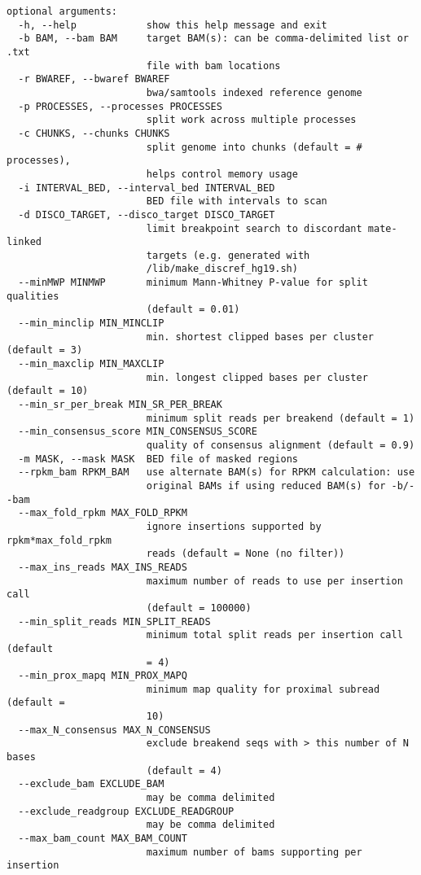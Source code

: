 \documentclass[letterpaper,11pt]{article}
\begin{document}
\begin{verbatim}
optional arguments:
  -h, --help            show this help message and exit
  -b BAM, --bam BAM     target BAM(s): can be comma-delimited list or .txt
                        file with bam locations
  -r BWAREF, --bwaref BWAREF
                        bwa/samtools indexed reference genome
  -p PROCESSES, --processes PROCESSES
                        split work across multiple processes
  -c CHUNKS, --chunks CHUNKS
                        split genome into chunks (default = # processes),
                        helps control memory usage
  -i INTERVAL_BED, --interval_bed INTERVAL_BED
                        BED file with intervals to scan
  -d DISCO_TARGET, --disco_target DISCO_TARGET
                        limit breakpoint search to discordant mate-linked
                        targets (e.g. generated with
                        /lib/make_discref_hg19.sh)
  --minMWP MINMWP       minimum Mann-Whitney P-value for split qualities
                        (default = 0.01)
  --min_minclip MIN_MINCLIP
                        min. shortest clipped bases per cluster (default = 3)
  --min_maxclip MIN_MAXCLIP
                        min. longest clipped bases per cluster (default = 10)
  --min_sr_per_break MIN_SR_PER_BREAK
                        minimum split reads per breakend (default = 1)
  --min_consensus_score MIN_CONSENSUS_SCORE
                        quality of consensus alignment (default = 0.9)
  -m MASK, --mask MASK  BED file of masked regions
  --rpkm_bam RPKM_BAM   use alternate BAM(s) for RPKM calculation: use
                        original BAMs if using reduced BAM(s) for -b/--bam
  --max_fold_rpkm MAX_FOLD_RPKM
                        ignore insertions supported by rpkm*max_fold_rpkm
                        reads (default = None (no filter))
  --max_ins_reads MAX_INS_READS
                        maximum number of reads to use per insertion call
                        (default = 100000)
  --min_split_reads MIN_SPLIT_READS
                        minimum total split reads per insertion call (default
                        = 4)
  --min_prox_mapq MIN_PROX_MAPQ
                        minimum map quality for proximal subread (default =
                        10)
  --max_N_consensus MAX_N_CONSENSUS
                        exclude breakend seqs with > this number of N bases
                        (default = 4)
  --exclude_bam EXCLUDE_BAM
                        may be comma delimited
  --exclude_readgroup EXCLUDE_READGROUP
                        may be comma delimited
  --max_bam_count MAX_BAM_COUNT
                        maximum number of bams supporting per insertion

\end{verbatim}
\end{document}

